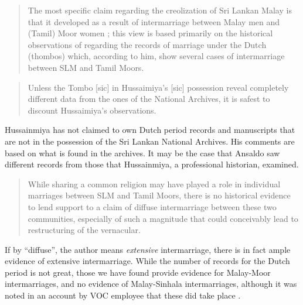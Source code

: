 \begin{quote}
  The most specific claim regarding the creolization of Sri Lankan Malay is that it developed as a result of intermarriage between Malay men and (Tamil) Moor women \citep[e.g.][]{SmithEtAl2004}; this view is based primarily on the historical observations of \citet{Hussainmiya1987,Hussainmiya1990} regarding the records of marriage under the Dutch (thombos) which, according to him, show several cases of intermarriage between SLM and Tamil Moors.  
\end{quote}

\begin{quote}
 Unless the Tombo [sic] in Hussaimiya's [sic] possession reveal completely different data from the ones of the National Archives, it is safest to discount Hussaimiya's observations. 
\end{quote}

Hussainmiya has not claimed to own Dutch period records and manuscripts that are not in the possession of the Sri Lankan National Archives. His comments are based on what is found in the archives. It may be the case that Ansaldo saw different records from those that Hussainmiya, a professional historian, examined.

\begin{quote}
 While sharing a common religion may have played a role in individual marriages between SLM and Tamil Moors, there is no historical evidence to lend support to a claim of diffuse intermarriage between these two communities, especially of such a magnitude that could conceivably lead to restructuring of the vernacular.
\end{quote}


If by ``diffuse'', the author means \textit{extensive} intermarriage, there is in fact ample evidence of extensive intermarriage. While the number of records for the Dutch period is not great, those we have found provide evidence for Malay-Moor intermarriages, and no evidence of Malay-Sinhala intermarriages, although it was noted in an account by VOC employee \citet{Schweitzer1680} that these did take place \citep[11]{Nordhoff2009}.

